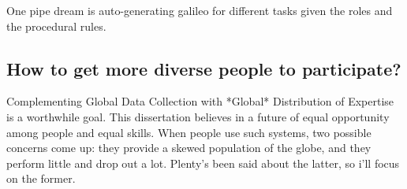One pipe dream is auto-generating galileo for different tasks given the roles and the procedural rules.




%
%

\subsection{How to get more diverse people to participate?}

Complementing Global Data Collection with *Global* Distribution of Expertise is a worthwhile goal. This dissertation believes in a future of equal opportunity among people and equal skills. When people use such systems, two possible concerns come up: they provide a skewed population of the globe, and they perform little and drop out a lot. Plenty's been said about the latter, so i'll focus on the former.

